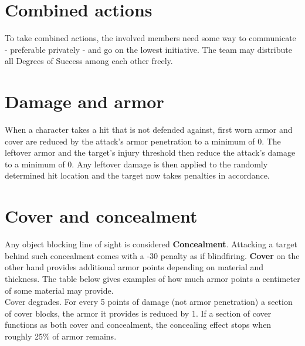 \section{Combined actions}
\label{combinedaction}
To take combined actions, the involved members need some way to communicate - preferable privately - and go on the lowest initiative. The team may distribute all Degrees of Success among each other freely.
\section{Damage and armor}
When a character takes a hit that is not defended against, first worn armor and cover are reduced by the attack's armor penetration to a minimum of 0. The leftover armor and the target’s injury threshold then reduce the attack’s damage to a minimum of 0. Any leftover damage is then applied to the randomly determined hit location and the target now takes penalties in accordance.
\section{Cover and concealment}
Any object blocking line of sight is considered \textbf{Concealment}. Attacking a target behind such concealment comes with a -30 penalty as if blindfiring.
\textbf{Cover} on the other hand provides additional armor points depending on material and thickness. The table below gives examples of how much armor points a centimeter of some material may provide.\\
Cover degrades. For every 5 points of damage (not armor penetration) a section of cover blocks, the armor it provides is reduced by 1. If a section of cover functions as both cover and concealment, the concealing effect stops when roughly 25\% of armor remains.
